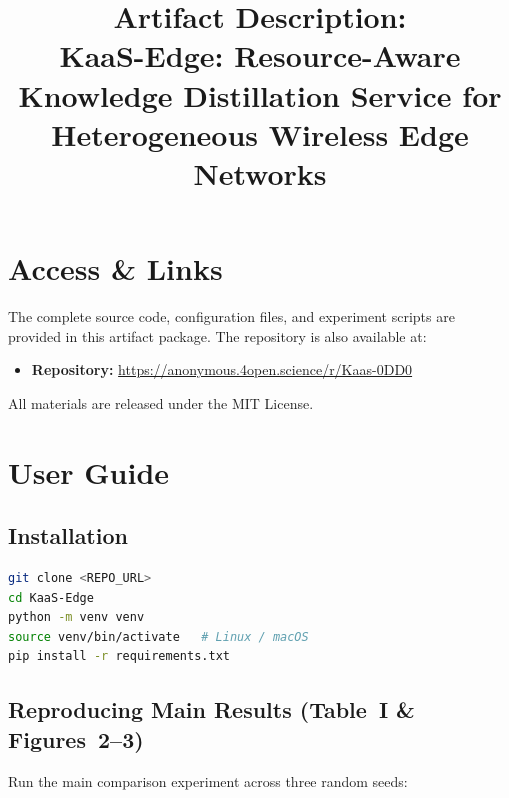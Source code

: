 \documentclass[conference]{IEEEtran}
\begin{document}
\title{Artifact Description:\\KaaS-Edge: Resource-Aware Knowledge Distillation Service for Heterogeneous Wireless Edge Networks}

\author{
}

\maketitle

\section{Access \& Links}

The complete source code, configuration files, and experiment scripts are provided in this artifact package.
The repository is also available at:

\begin{itemize}
  \item \textbf{Repository:} \url{https://anonymous.4open.science/r/Kaas-0DD0}
\end{itemize}

\noindent All materials are released under the MIT License.

\section{User Guide}

\subsection{Installation}

\begin{lstlisting}[language=bash]
git clone <REPO_URL>
cd KaaS-Edge
python -m venv venv
source venv/bin/activate   # Linux / macOS
pip install -r requirements.txt
\end{lstlisting}

\subsection{Reproducing Main Results (Table~I \& Figures~2--3)}

Run the main comparison experiment across three random seeds:
\end{document}
